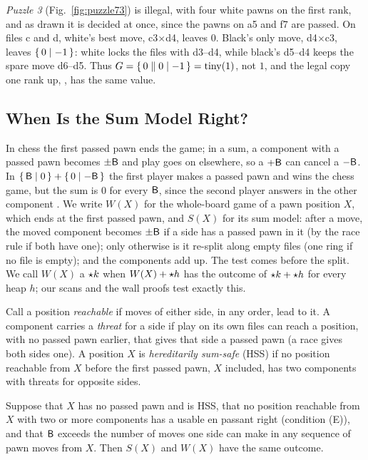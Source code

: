 \emph{Puzzle 3} (Fig.~\ref{fig:puzzle73}) is illegal, with four white pawns on the first rank, and as drawn it
is decided at once, since the pawns on a5 and f7 are passed. On files c and d, white's best move, c3$\times$d4,
leaves $0$. Black's only move, d4$\times$c3, leaves $\{\,0 \mid -1\,\}$: white locks the files with d3--d4, while
black's d5--d4 keeps the spare move d6--d5. Thus $G=\{\,0 \parallel 0\mid -1\,\}=\operatorname{tiny}(1)$, not $1$, and the legal copy
one rank up, , has the same value.

\subsection{When Is the Sum Model Right?}\label{sec:sums-hss}

In chess the first passed pawn ends the game; in a sum, a component with a passed pawn becomes $\pm\mathsf{B}$ and
play goes on elsewhere, so a $+\mathsf{B}$ can cancel a $-\mathsf{B}$. In $\{\,\mathsf{B} \mid 0\,\}+\{\,0 \mid -\mathsf{B}\,\}$ the first player
makes a passed pawn and wins the chess game, but the sum is $0$ for every $\mathsf{B}$, since the second player
answers in the other component . We write $W(X)$ for the whole-board game of a pawn position $X$, which ends at
the first passed pawn, and $S(X)$ for its sum model: after a move, the moved component becomes $\pm\mathsf{B}$ if a
side has a passed pawn in it (by the race rule if both have one); only otherwise is it re-split along empty files (one ring
if no file is empty); and the components add up. The test comes before the split. We call $W(X)$ a $\mathord{\star k}$ when $W(X)+\mathord{\star h}$ has
the outcome of $\mathord{\star k}+\mathord{\star h}$ for every heap $h$; our scans and the wall proofs test exactly this.

\begin{definition}\label{def:hss}
Call a position \emph{reachable} if moves of either side, in any order, lead to it. A component carries a
\emph{threat} for a side if play on its own files can reach a position, with no passed pawn earlier, that gives that side a passed pawn (a race gives both sides one). A position $X$ is
\emph{hereditarily sum-safe} (HSS) if no position reachable from $X$ before the first passed pawn, $X$ included, has two components with threats for opposite sides.
\end{definition}

\begin{theorem}\label{thm:hss}
Suppose that $X$ has no passed pawn and is HSS, that no position reachable from $X$ with two or more components has a usable en
passant right (condition (E)), and that $\mathsf{B}$ exceeds the number of moves one side can make in any sequence of pawn moves from $X$. Then $S(X)$ and $W(X)$ have the same
outcome.
\end{theorem}

